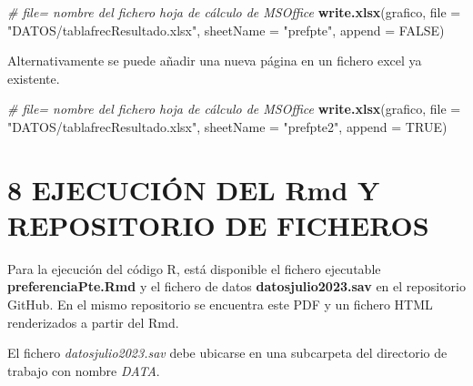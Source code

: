 \documentclass[
  12 pt,
  a4paper,
]{article}
\newenvironment{Shaded}{\begin{snugshade}}{\end{snugshade}}
\newcommand{\AttributeTok}[1]{\textcolor[rgb]{0.13,0.29,0.53}{#1}}
\newcommand{\CommentTok}[1]{\textcolor[rgb]{0.56,0.35,0.01}{\textit{#1}}}
\newcommand{\ConstantTok}[1]{\textcolor[rgb]{0.56,0.35,0.01}{#1}}
\newcommand{\FunctionTok}[1]{\textcolor[rgb]{0.13,0.29,0.53}{\textbf{#1}}}
\newcommand{\NormalTok}[1]{#1}
\newcommand{\StringTok}[1]{\textcolor[rgb]{0.31,0.60,0.02}{#1}}
\begin{document}
\begin{Shaded}
\begin{Highlighting}[]
\CommentTok{\# file= nombre del fichero hoja de cálculo de MSOffice}
\FunctionTok{write.xlsx}\NormalTok{(grafico, }\AttributeTok{file =} \StringTok{"DATOS/tablafrecResultado.xlsx"}\NormalTok{,}
           \AttributeTok{sheetName =} \StringTok{"prefpte"}\NormalTok{, }\AttributeTok{append =} \ConstantTok{FALSE}\NormalTok{)    }
\end{Highlighting}
\end{Shaded}

Alternativamente se puede añadir una nueva página en un fichero excel ya
existente.

\begin{Shaded}
\begin{Highlighting}[]
\CommentTok{\# file= nombre del fichero hoja de cálculo de MSOffice}
\FunctionTok{write.xlsx}\NormalTok{(grafico, }\AttributeTok{file =} \StringTok{"DATOS/tablafrecResultado.xlsx"}\NormalTok{,}
           \AttributeTok{sheetName =} \StringTok{"prefpte2"}\NormalTok{, }\AttributeTok{append =} \ConstantTok{TRUE}\NormalTok{)    }
\end{Highlighting}
\end{Shaded}

\newpage

\hypertarget{id-github}{%
\section{8 EJECUCIÓN DEL Rmd Y REPOSITORIO DE
FICHEROS}\label{id-github}}

Para la ejecución del código R, está disponible el fichero ejecutable
\textbf{preferenciaPte.Rmd} y el fichero de datos
\textbf{datosjulio2023.sav} en el repositorio GitHub. En el mismo
repositorio se encuentra este PDF y un fichero HTML renderizados a
partir del Rmd.

El fichero \emph{datosjulio2023.sav} debe ubicarse en una subcarpeta del
directorio de trabajo con nombre \emph{DATA}.
\end{document}
